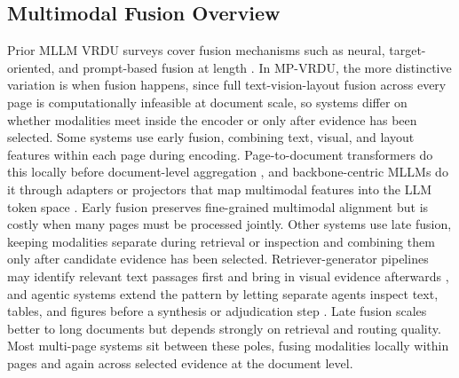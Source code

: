 \documentclass[11pt]{article}
\begin{document}
\subsection{Multimodal Fusion Overview}
Prior MLLM VRDU surveys cover fusion mechanisms such as neural, target-oriented, and prompt-based fusion at length \cite{ding2025survey}. In MP-VRDU, the more distinctive variation is when fusion happens, since full text-vision-layout fusion across every page is computationally infeasible at document scale, so systems differ  on whether modalities meet inside the encoder or only after evidence has been selected. Some systems use early fusion, combining text, visual, and layout features within each page during encoding. Page-to-document transformers do this locally before document-level aggregation \cite{tito2023hierarchical, blau2024gram, borchmann2025arctic}, and backbone-centric MLLMs do it through adapters or projectors that map multimodal features into the LLM token space \cite{tanaka2024instructdoc, jia2024leopard}. Early fusion preserves fine-grained multimodal alignment but is costly when many pages must be processed jointly. Other systems use late fusion, keeping modalities separate during retrieval or inspection and combining them only after candidate evidence has been selected. Retriever-generator pipelines may identify relevant text passages first and bring in visual evidence afterwards \cite{zhang2024cream, gong2025mhier}, and agentic systems extend the pattern by letting separate agents inspect text, tables, and figures before a synthesis or adjudication step \cite{han2025mdocagent, duan2025m2rag, zhu2025doclens}. Late fusion scales better to long documents but depends strongly on retrieval and routing quality. Most multi-page systems sit between these poles, fusing modalities locally within pages and again across selected evidence at the document level.

\end{document}
